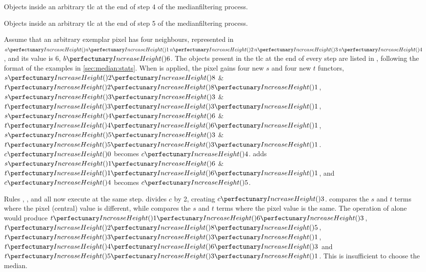 \begin{cpobjectsfloat}
\begin{cpobjects}
\end{cpobjects}
\caption{\label{objs:medianfilter:ex4}Objects inside an arbitrary \gls{tlc} at the end of step 4 of the \gls{medianfilter}ing process.}
\end{cpobjectsfloat}

\begin{cpobjectsfloat}
\begin{cpobjects}
\end{cpobjects}
\caption{\label{objs:medianfilter:ex5}Objects inside an arbitrary \gls{tlc} at the end of step 5 of the \gls{medianfilter}ing process.}
\end{cpobjectsfloat}

Assume that an arbitrary exemplar pixel has four neighbours, represented in \(\cpfunc{a}{\cpfunc{n}{1} \, \cpfunc{n}{2} \, \cpfunc{n}{3} \, \cpfunc{n}{4}}\), and its value is 6, \(\cpfunc{b}{6}\).  The objects present in the \gls{tlc} at the end of every step are listed in , following the format of the examples in \vref{sec:median:stats}.  When  is applied, the pixel gains four new \(s\) and four new \(t\) \glspl{functor}, \(\cpfuncn{s}{2}{8}\) \& \(\cpfuncnn{t}{2}{8}{1}\), \(\cpfuncn{s}{3}{3}\) \& \(\cpfuncnn{t}{3}{3}{1}\), \(\cpfuncn{s}{4}{6}\) \& \(\cpfuncnn{t}{4}{6}{1}\), \(\cpfuncn{s}{5}{3}\) \& \(\cpfuncnn{t}{5}{3}{1}\).  \(\cpfunc{c}{0}\) becomes \(\cpfunc{c}{4}\).   adds \(\cpfuncn{s}{1}{6}\) \& \(\cpfuncnn{t}{1}{6}{1}\), and \(\cpfunc{c}{4}\) becomes \(\cpfunc{c}{5}\).

Rules , , and  all now execute at the same step.   divides \(c\) by 2, creating \(\cpfunc{c}{3}\).   compares the \(s\) and \(t\) terms where the pixel (central) value is different, while  compares the \(s\) and \(t\) terms where the pixel value is the same.  The operation of  alone would produce \(\cpfuncnn{t}{1}{6}{3}\), \(\cpfuncnn{t}{2}{8}{5}\), \(\cpfuncnn{t}{3}{3}{1}\), \(\cpfuncnn{t}{4}{6}{3}\) and \(\cpfuncnn{t}{5}{3}{1}\).  This is insufficient to choose the median.


